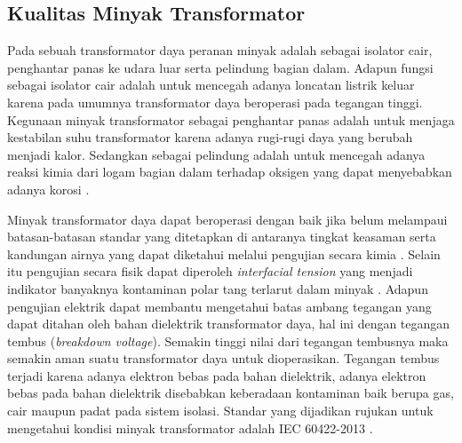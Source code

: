 \subsection{Kualitas Minyak Transformator}
Pada sebuah transformator daya peranan minyak adalah sebagai isolator cair, penghantar panas ke udara luar serta pelindung bagian dalam. Adapun fungsi sebagai isolator cair adalah untuk mencegah adanya loncatan listrik keluar karena pada umumnya transformator daya beroperasi pada tegangan tinggi. Kegunaan minyak transformator sebagai penghantar panas adalah untuk menjaga kestabilan suhu transformator karena adanya rugi-rugi daya yang berubah menjadi kalor. Sedangkan sebagai pelindung adalah untuk mencegah adanya reaksi kimia dari logam bagian dalam terhadap oksigen yang dapat menyebabkan adanya korosi \cite{pln2003panduan}.

Minyak transformator daya dapat beroperasi dengan baik jika belum melampaui batasan-batasan standar yang ditetapkan di antaranya tingkat keasaman serta kandungan airnya yang dapat diketahui melalui pengujian secara kimia \cite{ieee2007ieee}. Selain itu pengujian secara fisik dapat diperoleh \textit{interfacial tension} yang menjadi indikator banyaknya kontaminan polar tang terlarut dalam minyak \cite{sutaryono2015analisa}. Adapun pengujian elektrik dapat membantu mengetahui batas ambang tegangan yang dapat ditahan oleh bahan dielektrik transformator daya, hal ini dengan tegangan tembus (\textit{breakdown voltage}). Semakin tinggi nilai dari tegangan tembusnya maka semakin aman suatu transformator daya untuk dioperasikan. Tegangan tembus terjadi karena adanya elektron bebas pada bahan dielektrik, adanya elektron bebas pada bahan dielektrik disebabkan keberadaan kontaminan baik berupa gas, cair maupun padat pada sistem isolasi. Standar yang dijadikan rujukan untuk mengetahui kondisi minyak transformator adalah IEC 60422-2013 \cite{standard2013mineral}.

